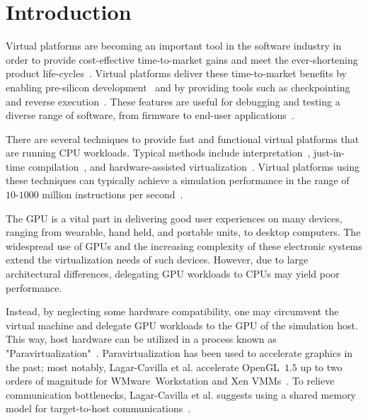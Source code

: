 
\section{Introduction}
\label{sec:introduction}
Virtual platforms are becoming an important tool in the software industry in order to provide cost-effective time-to-market gains and meet the ever-shortening product life-cycles~.
Virtual platforms deliver these time-to-market benefits by enabling pre-silicon development~ and by providing tools such as checkpointing and reverse execution~.
These features are useful for debugging and testing a diverse range of software, from firmware to end-user applications~.

There are several techniques to provide fast and functional virtual platforms that are running CPU workloads.
Typical methods include interpretation~, just-in-time compilation~, and hardware-assisted virtualization~.
Virtual platforms using these techniques can typically achieve a simulation performance in the range of $10$-$1000$ million instructions per second~.

The GPU is a vital part in delivering good user experiences on many devices, ranging from wearable, hand held, and portable units, to desktop computers.
The widespread use of GPUs and the increasing complexity of these electronic systems extend the virtualization needs of such devices.
However, due to large architectural differences, delegating GPU workloads to CPUs may yield poor performance.

Instead, by neglecting some hardware compatibility, one may circumvent the virtual machine and delegate GPU workloads to the GPU of the simulation host.
This way, host hardware can be utilized in a process known as "Paravirtualization"~.
Paravirtualization has been used to accelerate graphics in the past; most notably, Lagar-Cavilla et al. accelerate OpenGL~$1.5$ up to two orders of magnitude for WMware~Workstation and Xen VMMs~.
To relieve communication bottlenecks, Lagar-Cavilla et al. suggests using a shared memory model for target-to-host communications~.

